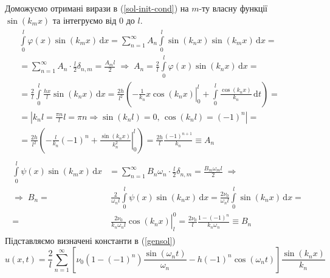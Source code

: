 Доможуємо отримані вирази в (\ref{sol-init-cond}) на $m$-ту власну функції $\sin(k_m x)$ та інтегруємо від $0$ до $l$. 
\begin{equation*}
    \begin{aligned}
        \begin{aligned}
            &\int\limits_0^l \varphi(x) \sin(k_m x) \,\mathrm{d}x = \sum^{\infty}_{n=1} A_n \int\limits_0^l \sin(k_n x) \sin(k_m x) \,\mathrm{d}x =\\
            &= \sum^{\infty}_{n=1} A_n \cdot \frac{l}{2} \delta_{n,m} = \frac{A_m l}{2}
            \;\Rightarrow\;
            A_n = \frac{2}{l} \int\limits_0^l \varphi(x) \sin(k_n x) \,\mathrm{d}x =\\
            &= \frac{2}{l} \int\limits_0^l \frac{hx}{l} \sin(k_n x) \,\mathrm{d}x = \frac{2h}{l^2} \left(\left.-\frac{1}{k_n} x \cos(k_n x)\right|_0^l + \int\limits_0^l \frac{\cos(k_n x)}{k_n} \,\mathrm{d}t\right) =\\
            &= \left| k_n l = \frac{\pi n}{l} l = \pi n \Rightarrow \sin(k_n l) = 0,\, \cos(k_n l) = (-1)^n \right| =\\
            &= \frac{2h}{l^2} \left(-\frac{l}{k_n}(-1)^n + \left.\frac{\sin(k_n x)}{k_n^2}\right|_0^l \right) = \frac{2h}{l} \frac{(-1)^{n+1}}{k_n} \equiv A_n
        \end{aligned}\\
        \begin{aligned}
            \int\limits_0^l \psi(x) \sin(k_m x) \,\mathrm{d}x &= \sum^{\infty}_{n=1} B_n\omega_n \cdot \frac{l}{2} \delta_{n,m} = \frac{B_m \omega_m l}{2}
            \;\Rightarrow\\
            \Rightarrow\;
            B_n =&\ \frac{2}{\omega_n l} \int\limits_0^l \psi(x) \sin(k_n x) \,\mathrm{d}x = \frac{2\nu_0}{\omega_n l} \int\limits_0^l \sin(k_n x) \,\mathrm{d}x =\\
            =&\ \left.\frac{2\nu_0}{k_n\omega_n l} \cos(k_n x)\right|_l^0 = \frac{2\nu_0}{l} \frac{1 - (-1)^n}{k_n\omega_n} \equiv B_n
        \end{aligned}
    \end{aligned}
\end{equation*} 
Підставляємо визначені константи в (\ref{gensol})
\begin{equation} \label{sol3}
    u(x,t) = \frac{2}{l}\sum^{\infty}_{n=1} \left[\nu_0 (1 - (-1)^n)\frac{\sin(\omega_n t)}{\omega_n} - h(-1)^n\cos(\omega_n t)\right] \frac{\sin(k_n x)}{k_n}
\end{equation}


